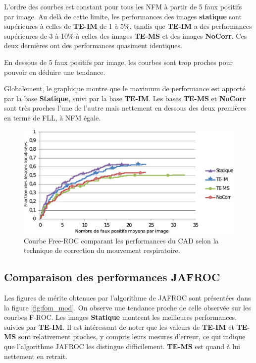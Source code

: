 L'ordre des courbes est constant pour tous les NFM à partir de 5 faux positifs par image. Au delà de cette limite, les performances des images \textbf{statique} sont supérieures à celles de \textbf{TE-IM} de 1 à 5\%, tandis que \textbf{TE-IM} a des performances supérieures de 3 à 10\% à celles des images \textbf{TE-MS} et des images \textbf{NoCorr}. Ces deux dernières ont des performances quasiment identiques.

En dessous de 5 faux positifs par image, les courbes sont trop proches pour pouvoir en déduire une tendance.


Globalement, le graphique montre que le maximum de performance est apporté par la base \textbf{Statique}, suivi par la base \textbf{TE-IM}. Les bases \textbf{TE-MS} et \textbf{NoCorr} sont très proches l'une de l'autre mais nettement en dessous des deux premières en terme de FLL, à NFM égale.

\begin{figure}[h!]
 \begin{center}
   \includegraphics[width=13cm]{images/FROC_mod_corrige}
 \end{center}
 \caption{Courbe Free-ROC comparant les performances du CAD selon la technique de correction du mouvement respiratoire.}
 \label{fig:froc_mod}
\end{figure}


\subsection{Comparaison des performances JAFROC}

Les figures de mérite obtenues par l'algorithme de JAFROC sont présentées dans la figure \ref{fig:fom_mod}. On observe une tendance proche de celle observée sur les courbes F-ROC. Les images \textbf{Statique} montrent les meilleures performances, suivies par \textbf{TE-IM}. Il est intéressant de noter que les valeurs de \textbf{TE-IM} et \textbf{TE-MS} sont relativement proches, y compris leurs mesures d'erreur, ce qui indique que l'algorithme JAFROC les distingue difficilement. \textbf{TE-MS} est quand à lui nettement en retrait. 


